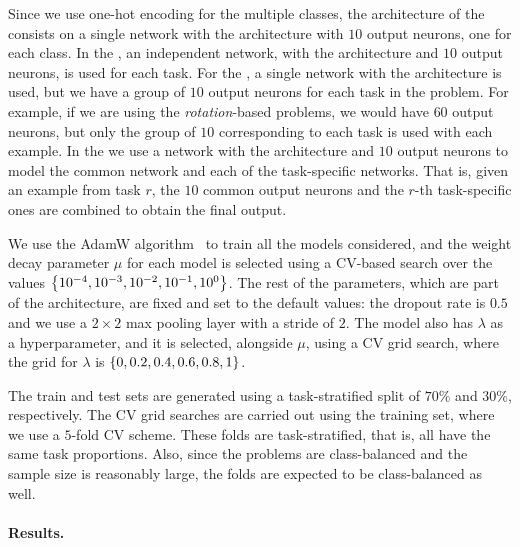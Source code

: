 %
Since we use one-hot encoding for the multiple classes, the architecture of the  consists on a single network with the  architecture with $10$ output neurons, one for each class.
%
In the , an independent network, with the  architecture and $10$ output neurons, is used for each task.
%
For the , a single network with the  architecture is used, but we have a group of $10$ output neurons for each task in the problem. For example, if we are using the \emph{rotation}-based problems, we would have $60$ output neurons, but only the group of $10$ corresponding to each task is used with each example.
%
In the  we use a network with the  architecture and $10$ output neurons to model the common network and each of the task-specific networks. That is, given an example from task $r$, the $10$ common output neurons and the  $r$-th task-specific ones are combined to obtain the final output. 

We use the AdamW algorithm~\citep{LoshchilovH19} to train all the models considered, and the weight decay parameter $\mu$ for each model is selected using a CV-based search over the values $\left\{10^{-4}, 10^{-3}, 10^{-2}, 10^{-1}, 10^{0}\right\}$. The rest of the parameters, which are part of the architecture, are fixed and set to the default values: the dropout rate is $0.5$ and we use a $2\times 2$ max pooling layer with a stride of $2$.
%
The  model also has $\lambda$ as a hyperparameter, and it is selected, alongside $\mu$, using a CV grid search, where the grid for $\lambda$ is $\left\{0, 0.2, 0.4, 0.6, 0.8, 1\right\}$.

%
The train and test sets are generated using a task-stratified split of $70\%$ and $30\%$, respectively.
The CV grid searches are carried out using the training set, where we use a $5$-fold CV scheme. These folds are task-stratified, that is, all have the same task proportions. Also, since the problems are class-balanced and the sample size is reasonably large, the folds are expected to be class-balanced as well.

\paragraph*{Results.\\}

